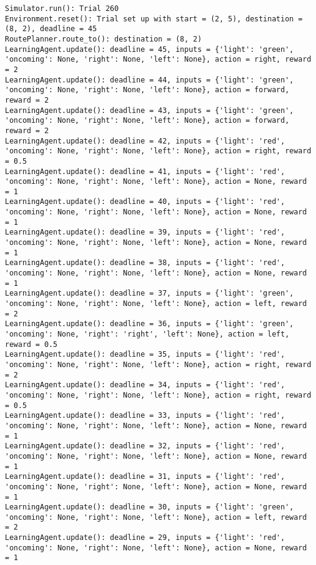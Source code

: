 \documentclass{article}
\begin{document}
\begin{verbatim}
Simulator.run(): Trial 260
Environment.reset(): Trial set up with start = (2, 5), destination = (8, 2), deadline = 45
RoutePlanner.route_to(): destination = (8, 2)
LearningAgent.update(): deadline = 45, inputs = {'light': 'green', 'oncoming': None, 'right': None, 'left': None}, action = right, reward = 2
LearningAgent.update(): deadline = 44, inputs = {'light': 'green', 'oncoming': None, 'right': None, 'left': None}, action = forward, reward = 2
LearningAgent.update(): deadline = 43, inputs = {'light': 'green', 'oncoming': None, 'right': None, 'left': None}, action = forward, reward = 2
LearningAgent.update(): deadline = 42, inputs = {'light': 'red', 'oncoming': None, 'right': None, 'left': None}, action = right, reward = 0.5
LearningAgent.update(): deadline = 41, inputs = {'light': 'red', 'oncoming': None, 'right': None, 'left': None}, action = None, reward = 1
LearningAgent.update(): deadline = 40, inputs = {'light': 'red', 'oncoming': None, 'right': None, 'left': None}, action = None, reward = 1
LearningAgent.update(): deadline = 39, inputs = {'light': 'red', 'oncoming': None, 'right': None, 'left': None}, action = None, reward = 1
LearningAgent.update(): deadline = 38, inputs = {'light': 'red', 'oncoming': None, 'right': None, 'left': None}, action = None, reward = 1
LearningAgent.update(): deadline = 37, inputs = {'light': 'green', 'oncoming': None, 'right': None, 'left': None}, action = left, reward = 2
LearningAgent.update(): deadline = 36, inputs = {'light': 'green', 'oncoming': None, 'right': 'right', 'left': None}, action = left, reward = 0.5
LearningAgent.update(): deadline = 35, inputs = {'light': 'red', 'oncoming': None, 'right': None, 'left': None}, action = right, reward = 2
LearningAgent.update(): deadline = 34, inputs = {'light': 'red', 'oncoming': None, 'right': None, 'left': None}, action = right, reward = 0.5
LearningAgent.update(): deadline = 33, inputs = {'light': 'red', 'oncoming': None, 'right': None, 'left': None}, action = None, reward = 1
LearningAgent.update(): deadline = 32, inputs = {'light': 'red', 'oncoming': None, 'right': None, 'left': None}, action = None, reward = 1
LearningAgent.update(): deadline = 31, inputs = {'light': 'red', 'oncoming': None, 'right': None, 'left': None}, action = None, reward = 1
LearningAgent.update(): deadline = 30, inputs = {'light': 'green', 'oncoming': None, 'right': None, 'left': None}, action = left, reward = 2
LearningAgent.update(): deadline = 29, inputs = {'light': 'red', 'oncoming': None, 'right': None, 'left': None}, action = None, reward = 1

\end{verbatim}
\end{document}
